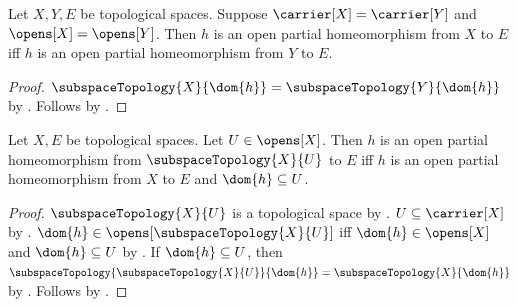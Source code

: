 \begin{theorem}\label{open_partial_homeomorphism_same_source_fields}
    Let $X,Y,E$ be topological spaces.
    Suppose $\carrier[X]=\carrier[Y]$ and $\opens[X]=\opens[Y]$.
    Then $h$ is an open partial homeomorphism from $X$ to $E$ iff
        $h$ is an open partial homeomorphism from $Y$ to $E$.
\end{theorem}
\begin{proof}
    $\subspaceTopology{X}{\dom{h}}=\subspaceTopology{Y}{\dom{h}}$ by
        .
    Follows by .
\end{proof}

\begin{theorem}\label{open_partial_homeomorphism_open_subspace}
    Let $X,E$ be topological spaces.
    Let $U\in\opens[X]$.
    Then $h$ is an open partial homeomorphism from $\subspaceTopology{X}{U}$ to $E$ iff
        $h$ is an open partial homeomorphism from $X$ to $E$ and $\dom{h}\subseteq U$.
\end{theorem}
\begin{proof}
    $\subspaceTopology{X}{U}$ is a topological space by .
    $U\subseteq\carrier[X]$ by .
    $\dom{h}\in\opens[\subspaceTopology{X}{U}]$ iff
        $\dom{h}\in\opens[X]$ and $\dom{h}\subseteq U$ by .
    If $\dom{h}\subseteq U$, then
        $\subspaceTopology{\subspaceTopology{X}{U}}{\dom{h}}=\subspaceTopology{X}{\dom{h}}$ by
        .
    Follows by .
\end{proof}

